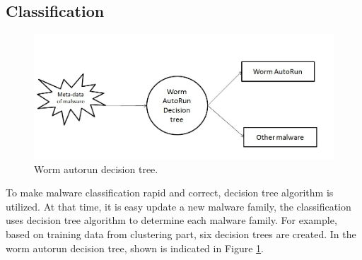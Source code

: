 \subsection{Classification}
\begin{figure}[h!]
\centering
\includegraphics[width=1\textwidth]{graph/classificationdecision.jpg}
\caption{Worm autorun decision tree.}
\label{fig:classificationdecision}
\end{figure}

To make malware classification rapid and correct, decision tree algorithm is utilized. At that time, it is easy update a new malware family, the classification uses decision tree algorithm to determine each malware family. For example, based on training data from clustering part, six decision trees are created. In the worm autorun decision tree, shown is indicated in Figure \ref{fig:classificationdecision}.

